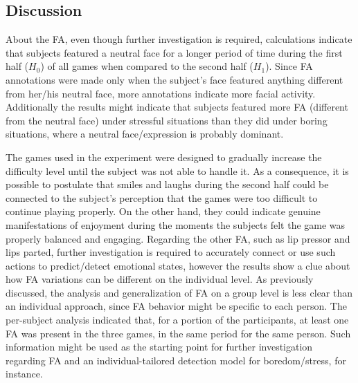 \subsection{Discussion}

About the FA, even though further investigation is required, calculations indicate that subjects featured a neutral face for a longer period of time during the first half ($H_0$) of all games when compared to the second half ($H_1$). Since FA annotations were made only when the subject's face featured anything different from her/his neutral face, more annotations indicate more facial activity. Additionally the results might indicate that subjects featured more FA (different from the neutral face) under stressful situations than they did under boring situations, where a neutral face/expression is probably dominant.

The games used in the experiment were designed to gradually increase the difficulty level until the subject was not able to handle it. As a consequence, it is possible to postulate that smiles and laughs during the second half could be connected to the subject's perception that the games were too difficult to continue playing properly. On the other hand, they could indicate genuine manifestations of enjoyment during the moments the subjects felt the game was properly balanced and engaging. Regarding the other FA, such as lip pressor and lips parted, further investigation is required to accurately connect or use such actions to predict/detect emotional states, however the results show a clue about how FA variations can be different on the individual level. As previously discussed, the analysis and generalization of FA on a group level is less clear than an individual approach, since FA behavior might be specific to each person. The per-subject analysis indicated that, for a portion of the participants, at least one FA was present in the three games, in the same period for the same person. Such information might be used as the starting point for further investigation regarding FA and an individual-tailored detection model for boredom/stress, for instance.


